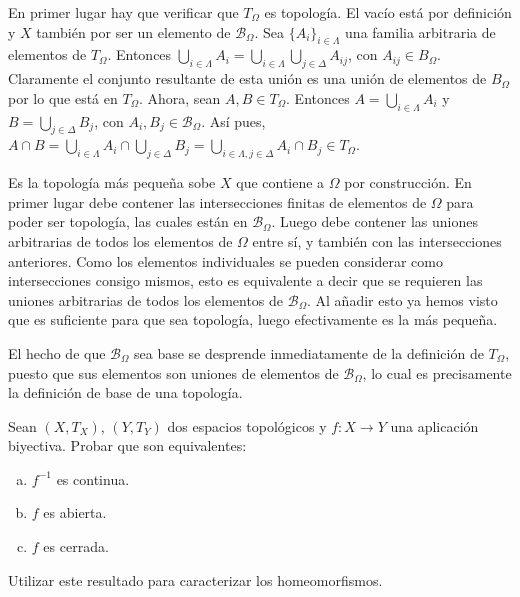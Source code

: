 \documentclass{article}
\begin{document}
\begin{sol}
En primer lugar hay que verificar que $T_\Omega$ es topología. El vacío está por definición y $X$ también por ser un elemento de $\mathcal{B}_\Omega$. Sea $\{A_i\}_{i\in\Lambda}$ una familia arbitraria de elementos de $T_\Omega$. Entonces $\bigcup_{i\in\Lambda}A_i=\bigcup_{i\in\Lambda}\bigcup_{j\in\Delta} A_{ij}$, con $A_{ij}\in B_\Omega$. Claramente el conjunto resultante de esta unión es una unión de elementos de $B_\Omega$ por lo que está en $T_\Omega$. Ahora, sean $A,B\in T_\Omega$. Entonces $A=\bigcup_{i\in\Lambda} A_i$ y $B=\bigcup_{j\in\Delta} B_j$, con $A_i,B_j\in\mathcal{B}_\Omega$. Así pues, $A\cap B=\bigcup_{i\in\Lambda} A_i\cap \bigcup_{j\in\Delta} B_j = \bigcup_{i\in\Lambda,j\in\Delta} A_i \cap B_j\in T_\Omega$.

Es la topología más pequeña sobe $X$ que contiene a $\Omega$ por construcción. En primer lugar debe contener las intersecciones finitas de elementos de $\Omega$ para poder ser topología, las cuales están en $\mathcal{B}_\Omega$. Luego debe contener las uniones arbitrarias de todos los elementos de $\Omega$ entre sí, y también con las intersecciones anteriores. Como los elementos individuales se pueden considerar como intersecciones consigo mismos, esto es equivalente a decir que se requieren las uniones arbitrarias de todos los elementos de $\mathcal{B}_\Omega$. Al añadir esto ya hemos visto que es suficiente para que sea topología, luego efectivamente es la más pequeña.

El hecho de que $\mathcal{B}_\Omega$ sea base se desprende inmediatamente de la definición de $T_\Omega$, puesto que sus elementos son uniones de elementos de $\mathcal{B}_\Omega$, lo cual es precisamente la definición de base de una topología.
\end{sol}


\newpage
\begin{ejer}
Sean $(X,T_X)$, $(Y,T_Y)$ dos espacios topológicos y $f:X\rightarrow Y$ una aplicación biyectiva. Probar que son equivalentes:
\begin{enumerate}[(a)]
\item $f^{-1}$ es continua.
\item $f$ es abierta.
\item $f$ es cerrada.
\end{enumerate}
Utilizar este resultado para caracterizar los homeomorfismos.
\end{ejer}
\end{document}
